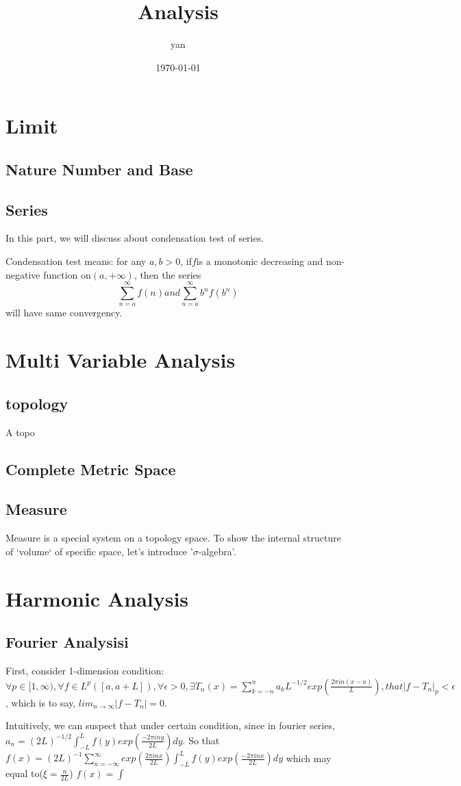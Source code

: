 \documentclass{book}
\title{Analysis}
\author{yan}
\date{\today}
\begin{document}
\frontmatter
\maketitle
\tableofcontents

\mainmatter
\part{Limit}
\chapter{Nature Number and Base}
\chapter{Series}

In this part, we will discuss about condensation test of series.

Condensation test means: for any $a, b > 0$, if$f$is a monotonic decreasing and non-negative function on$(a,+\infty)$, then the series
\begin{equation}
\sum_{n=a}^{\infty} f(n) and \sum_{n=a}^{\infty} b^nf(b^n)
\end{equation}
will have same convergency.

\part{Multi Variable Analysis}
\chapter{topology}
A topo
\chapter{Complete Metric Space}


\chapter{Measure}
Measure is a special system on a topology space.
To show the internal structure of `volume` of specific space, let's introduce '$\sigma$-algebra'.

\part{Harmonic Analysis}
\chapter{Fourier Analysisi}
First, consider 1-dimension condition:
$\forall p \in [1, \infty),
\forall f \in L^p([a, a + L]),
\forall \epsilon > 0,
\exists T_n(x) = \sum_{k = -n}^n a_k L^{-1/2} exp(\frac{2 \pi i n(x - a)}{L}),
that |f - T_n|_p < \epsilon$, 
which is to say,
$lim_{n \rightarrow \infty}|f - T_n| = 0$.

Intuitively, we can suspect that under certain condition, since in fourier series,
$a_n = (2L)^{-1/2} \int_{-L}^{L} f(y) exp(\frac{-2 \pi i n y}{2 L}) dy.$
So that
$f(x) = (2L)^{-1} \sum_{n = -\infty}^{\infty} exp(\frac{2 \pi inx}{2L}) \int_{-L}^{L} f(y) exp(\frac{-2 \pi inx}{2L})dy$
which may equal to($\xi = \frac{n}{2L}$)
$f(x) = \int$
\end{document}
